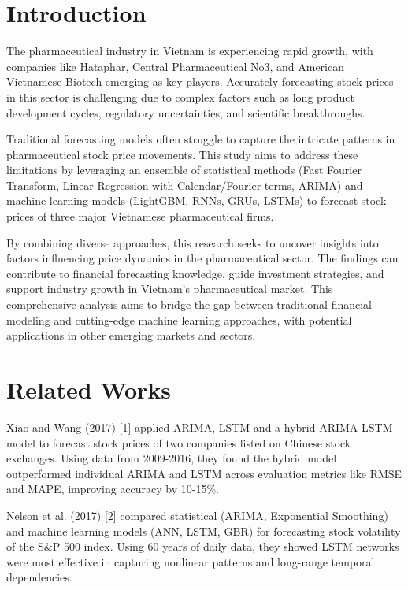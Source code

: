 \documentclass{ieeeojies}
\begin{document}
\titlepgskip=-15pt

\maketitle

\section{Introduction}
\label{sec:introduction}
The pharmaceutical industry in Vietnam is experiencing rapid growth, with companies like Hataphar, Central Pharmaceutical No3, and American Vietnamese Biotech emerging as key players. Accurately forecasting stock prices in this sector is challenging due to complex factors such as long product development cycles, regulatory uncertainties, and scientific breakthroughs.

Traditional forecasting models often struggle to capture the intricate patterns in pharmaceutical stock price movements. This study aims to address these limitations by leveraging an ensemble of statistical methods (Fast Fourier Transform, Linear Regression with Calendar/Fourier terms, ARIMA) and machine learning models (LightGBM, RNNs, GRUs, LSTMs) to forecast stock prices of three major Vietnamese pharmaceutical firms.

By combining diverse approaches, this research seeks to uncover insights into factors influencing price dynamics in the pharmaceutical sector. The findings can contribute to financial forecasting knowledge, guide investment strategies, and support industry growth in Vietnam's pharmaceutical market. This comprehensive analysis aims to bridge the gap between traditional financial modeling and cutting-edge machine learning approaches, with potential applications in other emerging markets and sectors.

\section{Related Works}

Xiao and Wang (2017) [1] applied ARIMA, LSTM and a hybrid ARIMA-LSTM model to forecast stock prices of two companies listed on Chinese stock exchanges. Using data from 2009-2016, they found the hybrid model outperformed individual ARIMA and LSTM across evaluation metrics like RMSE and MAPE, improving accuracy by 10-15\%.

Nelson et al. (2017) [2] compared statistical (ARIMA, Exponential Smoothing) and machine learning models (ANN, LSTM, GBR) for forecasting stock volatility of the S\&P 500 index. Using 60 years of daily data, they showed LSTM networks were most effective in capturing nonlinear patterns and long-range temporal dependencies.
\end{document}
